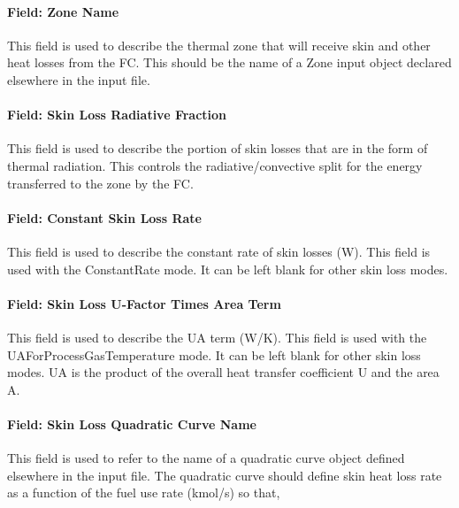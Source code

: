 \paragraph{Field: Zone Name}\label{field-zone-name-8-000}

This field is used to describe the thermal zone that will receive skin and other heat losses from the FC. This should be the name of a Zone input object declared elsewhere in the input file.

\paragraph{Field: Skin Loss Radiative Fraction}\label{field-skin-loss-radiative-fraction-1}

This field is used to describe the portion of skin losses that are in the form of thermal radiation. This controls the radiative/convective split for the energy transferred to the zone by the FC.

\paragraph{Field: Constant Skin Loss Rate}\label{field-constant-skin-loss-rate}

This field is used to describe the constant rate of skin losses (W). This field is used with the ConstantRate mode. It can be left blank for other skin loss modes.

\paragraph{Field: Skin Loss U-Factor Times Area Term}\label{field-skin-loss-u-factor-times-area-term}

This field is used to describe the UA term (W/K). This field is used with the UAForProcessGasTemperature mode. It can be left blank for other skin loss modes. UA is the product of the overall heat transfer coefficient U and the area A.

\paragraph{Field: Skin Loss Quadratic Curve Name}\label{field-skin-loss-quadratic-curve-name}

This field is used to refer to the name of a quadratic curve object defined elsewhere in the input file. The quadratic curve should define skin heat loss rate as a function of the fuel use rate (kmol/s) so that,

